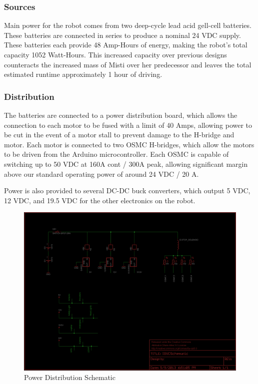 \subsubsection{Sources}
Main power for the robot comes from two deep-cycle lead acid gell-cell batteries. These batteries are
 connected in series to produce a nominal 24 VDC supply. These batteries each provide 48 Amp-Hours of energy, making the robot's total capacity 1052 Watt-Hours. This increased capacity over previous designs counteracts the increased mass of Misti over her predecessor and leaves the total estimated runtime approximately 1 hour of driving.

\subsubsection{Distribution}
The batteries are connected to a power distribution board, which allows the connection to each
motor to be fused with a limit of 40 Amps, allowing power to be cut in the event of a motor stall 
to prevent damage to the H-bridge and motor. Each motor is connected to two OSMC H-bridges, which allow the motors to be driven from the Arduino microcontroller. Each OSMC is capable of switching up to 50 VDC at 160A cont / 300A peak, allowing significant margin above our standard operating power of around 24 VDC / 20 A. 

Power is also provided to several DC-DC buck converters, which output 5 VDC, 12 VDC, and 19.5 VDC for the other electronics on the robot.

\begin{figure}[H]
\begin{center}
\includegraphics[width=5in]{./Pics/PowerSchematic.png}
\caption{Power Distribution Schematic}
\label{FIG:Distribution}
\end{center}
\end{figure}
